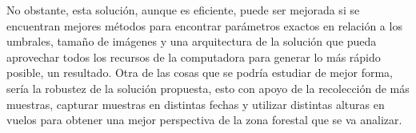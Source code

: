 \documentclass[review]{elsarticle}
\begin{document}
No obstante, esta solución, aunque es eficiente, puede ser mejorada si se encuentran mejores métodos para encontrar parámetros exactos en relación a los umbrales, tamaño de imágenes y una arquitectura de la solución que pueda aprovechar todos los recursos de la computadora para generar lo más rápido posible, un resultado. Otra de las cosas que se podría estudiar de mejor forma, sería la robustez de la solución propuesta, esto con apoyo de la recolección de más muestras, capturar muestras en distintas fechas y  utilizar distintas alturas en vuelos para obtener una mejor perspectiva de la zona forestal que se va analizar.



\end{document}
